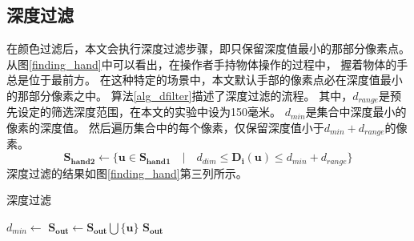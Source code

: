 \subsection{深度过滤}
在颜色过滤后，本文会执行深度过滤步骤，即只保留深度值最小的那部分像素点。
从图\ref{finding_hand}中可以看出，在操作者手持物体操作的过程中，
握着物体的手总是位于最前方。
在这种特定的场景中，本文默认手部的像素点必在深度值最小的那部分像素之中。
算法\ref{alg_dfilter}描述了深度过滤的流程。
其中，$d_{range}$是预先设定的筛选深度范围，在本文的实验中设为150毫米。
$d_{min}$是集合中深度最小的像素的深度值。
然后遍历集合中的每个像素，仅保留深度值小于$d_{min}+d_{range}$的像素。
\begin{equation}
    \bm{S_{hand2}} \gets
    \{
    \bm{u} \in \bm{S_{hand1}} \quad
    | \quad
    d_{dim} \leq \bm{D_i}(\bm{u}) \leq d_{min} + d_{range}
    \}
\end{equation}
深度过滤的结果如图\ref{finding_hand}第三列所示。
\begin{algorithm}
    \caption{深度过滤}
    \label{alg_dfilter}
    \begin{algorithmic}[1]
            \State $d_{min} \gets$ 
                    \State $\bm{S_{out}} \gets \bm{S_{out}} \bigcup \{\bm{u}\}$
                \EndIf
            \EndFor
            \State \Return $\bm{S_{out}}$
        \EndFunction
    \end{algorithmic}
\end{algorithm}
